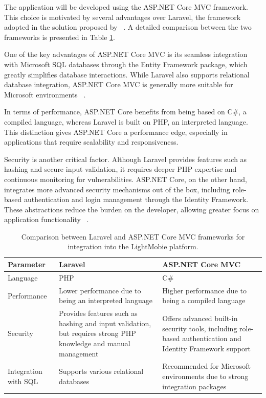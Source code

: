 The application will be developed using the ASP.NET Core MVC framework. This choice is motivated by several advantages over Laravel, the framework adopted in the solution proposed by ~\citet{MAS_MOTORS}. A detailed comparison between the two frameworks is presented in Table \ref{table:architetcture_comparison}.

One of the key advantages of ASP.NET Core MVC is its seamless integration with Microsoft SQL databases through the Entity Framework package, which greatly simplifies database interactions. While Laravel also supports relational database integration, ASP.NET Core MVC is generally more suitable for Microsoft environments ~\cite{asp_net_vs_laravel}.

In terms of performance, ASP.NET Core benefits from being based on C\#, a compiled language, whereas Laravel is built on PHP, an interpreted language. This distinction gives ASP.NET Core a performance edge, especially in applications that require scalability and responsiveness.

Security is another critical factor. Although Laravel provides features such as hashing and secure input validation, it requires deeper PHP expertise and continuous monitoring for vulnerabilities. ASP.NET Core, on the other hand, integrates more advanced security mechanisms out of the box, including role-based authentication and login management through the Identity Framework. These abstractions reduce the burden on the developer, allowing greater focus on application functionality ~\cite{asp_net_vs_laravel}.

\begin{table}[]
\begin{tabular}{| m{5em} | m{15em} | m{15em} |}
\hline
Parameter & Laravel & ASP.NET Core MVC \\
\hline
Language & PHP & C\# \\
\hline
Performance & Lower performance due to being an interpreted language & Higher performance due to being a compiled language \\
\hline 
Security & Provides features such as hashing and input validation, but requires strong PHP knowledge and manual management & Offers advanced built-in security tools, including role-based authentication and Identity Framework support \\
\hline
Integration with SQL & Supports various relational databases & Recommended for Microsoft environments due to strong integration packages \\
\hline
\end{tabular}
\caption{Comparison between Laravel and ASP.NET Core MVC frameworks for integration into the LightMobie platform.}
\label{table:architetcture_comparison}
\end{table}
 
